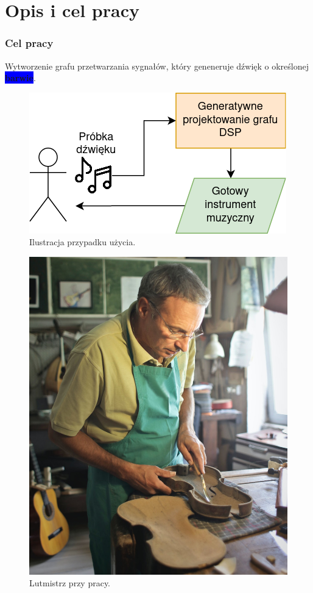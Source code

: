 \documentclass[]{beamer}
\begin{document}
\section{Opis i cel pracy}
\begin{frame}
  \frametitle{Cel pracy}

  \centering
  \Large
    Wytworzenie grafu przetwarzania sygnałów, który geneneruje dźwięk o określonej \colorbox{blue}{\color{white}\textbf{barwie}}.


  \begin{multicols}{2}
    \begin{figure}
      \centering
      \includegraphics[width=1.0\linewidth]{use_case_diagram.png}
      \caption{Ilustracja przypadku użycia.}
    \end{figure}

    \begin{figure}
      \centering
      \includegraphics[width=0.6\linewidth]{luthier_person.jpg}
      \caption{Lutmistrz przy pracy.}
    \end{figure}
  \end{multicols}
\end{frame}
\end{document}
